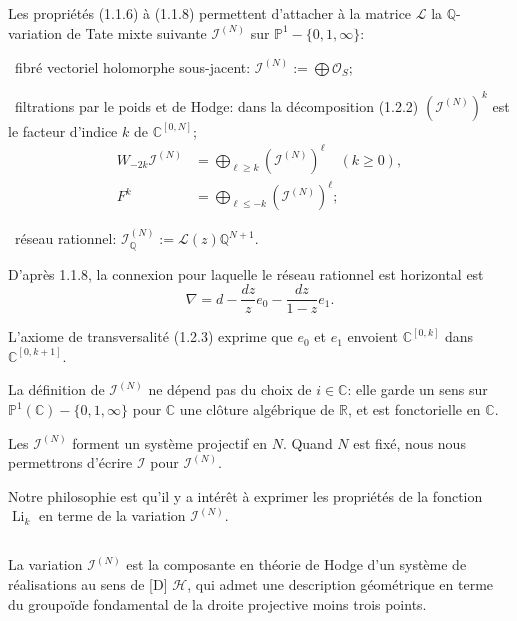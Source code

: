\documentclass[12pt,a4paper]{article}
\theoremstyle{plain}
\theoremstyle{definition}
\theoremstyle{remark}
\newcommand{\Q}{\mathbb{Q}}
\newcommand{\R}{\mathbb{R}}
\newcommand{\C}{\mathbb{C}}
\newcommand{\IP}{\mathbb{P}}
\begin{document}
\subsection{}

Les propri{\'e}t{\'e}s (1.1.6) {\`a} (1.1.8) permettent d'attacher {\`a} la matrice $\mathcal{L}$ la $\Q$-variation de Tate mixte suivante $\mathcal{I}^{(N)}$ sur $\IP^1-\{0,1,\infty\}$:

\textbullet\ fibr{\'e} vectoriel holomorphe sous-jacent: $\mathcal{I}^{(N)}:=\bigoplus\mathcal{O}_S$;

\textbullet\ filtrations par le poids et de Hodge: dans la d{\'e}composition (1.2.2) $(\mathcal{I}^{(N)})^k$ est le facteur d'indice $k$ de $\C^{[0,N]}$;
\begin{align*}
W_{-2k}\mathcal{I}^{(N)} &= \bigoplus_{\ell\geq k}(\mathcal{I}^{(N)})^\ell \quad (k\geq 0),\\
F^k &= \bigoplus_{\ell\leq -k}(\mathcal{I}^{(N)})^\ell;
\end{align*}

\textbullet\ r{\'e}seau rationnel: $\mathcal{I}_\Q^{(N)} := \mathcal{L}(z)\Q^{N+1}$.

D'apr{\`e}s 1.1.8, la connexion pour laquelle le r{\'e}seau rationnel est horizontal est
\begin{equation*}
\nabla = d - \frac{dz}{z}e_0 - \frac{dz}{1-z}e_1.
\end{equation*}

L'axiome de transversalit{\'e} (1.2.3) exprime que $e_0$ et $e_1$ envoient $\C^{[0,k]}$ dans $\C^{[0,k+1]}$.

La d{\'e}finition de $\mathcal{I}^{(N)}$ ne d{\'e}pend pas du choix de $i\in\C$: elle garde un sens sur $\IP^1(\C)-\{0,1,\infty\}$ pour $\C$ une cl{\^o}ture alg{\'e}brique de $\R$, et est fonctorielle en $\C$.

Les $\mathcal{I}^{(N)}$ forment un syst{\`e}me projectif en $N$. Quand $N$ est fix{\'e}, nous nous permettrons d'{\'e}crire $\mathcal{I}$ pour $\mathcal{I}^{(N)}$.

Notre philosophie est qu'il y a int{\'e}r{\^e}t {\`a} exprimer les propri{\'e}t{\'e}s de la fonction $\operatorname{Li}_k$ en terme de la variation $\mathcal{I}^{(N)}$.

\subsection{}

La variation $\mathcal{I}^{(N)}$ est la composante en th{\'e}orie de Hodge d'un syst{\`e}me de r{\'e}alisations au sens de [D] $\mathcal{H}$, qui admet une description g{\'e}om{\'e}trique en terme du groupo{\"i}de fondamental de la droite projective moins trois points.
\end{document}
